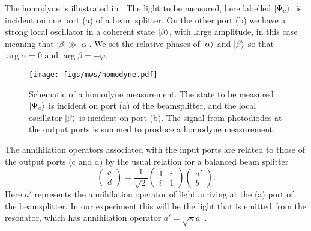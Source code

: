 The homodyne  is illustrated in . The
light to be measured, here labelled $\ket{\Psi_a}$, is incident on one port (a)
of a beam splitter. On the other port (b) we have a strong local oscillator in
a coherent state $\ket{\beta}$, with large amplitude, in
this case meaning that $|\beta| \gg |\alpha|$. We set the relative phases of
$\ket{\alpha}$ and $\ket{\beta}$ so that $\arg{\alpha}=0$ and
$\arg{\beta}=-\varphi$.

\begin{figure}
  \centering
  \texttt{[image: figs/mws/homodyne.pdf]}
  \caption{Schematic of a homodyne measurement. The state to be measured
    $\ket{\Psi_a}$ is incident on port (a) of the beamsplitter, and the local
    oscillator $\ket{\beta}$ is incident on port (b). The signal from
    photodiodes at the output ports is summed to produce a homodyne
    measurement.
  }
  \label{mws:fig:homodyne}
\end{figure}

The annihilation operators associated with the input ports are related to those
of the output ports (c and d) by the usual relation for a balanced beam
splitter~\cite{agarwal2012}
%
\begin{equation}
  \label{squeeze:eqn:bsmat}
  \begin{pmatrix} c \\ d \end{pmatrix} = \frac{1}{\sqrt{2}}\begin{pmatrix}
    1 & i \\ i & 1 
  \end{pmatrix}  \begin{pmatrix} a' \\ b \end{pmatrix}.
\end{equation}
%
Here $a'$ represents the annihilation operator of light arriving at the (a)
port of the beamsplitter. In our experiment this will be the light that is
emitted from the resonator, which has annihilation operator
$a'=\sqrt{\kappa}a$~\cite{Vanner16182}.
%

